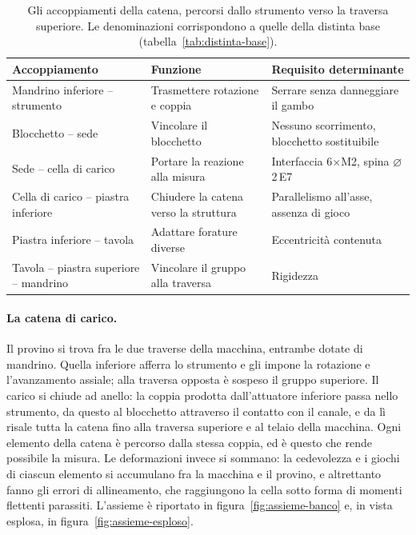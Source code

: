 \begin{table}[!tb]
    \centering
    \caption{Gli accoppiamenti della catena, percorsi dallo strumento verso la
    traversa superiore. Le denominazioni corrispondono a quelle della distinta
    base (tabella~\ref{tab:distinta-base}).}
    \label{tab:accoppiamenti}
    \footnotesize
    \setlength{\tabcolsep}{4pt}
    \begin{tabularx}{\linewidth}{@{}
        >{\hsize=1.2\hsize\raggedright\arraybackslash}X
        >{\hsize=0.95\hsize\raggedright\arraybackslash}X
        >{\hsize=0.85\hsize\raggedright\arraybackslash}X@{}}
        \toprule
        Accoppiamento & Funzione & Requisito determinante \\
        \midrule
        Mandrino inferiore -- strumento
            & Trasmettere rotazione e coppia
            & Serrare senza danneggiare il gambo \\
        Blocchetto -- sede
            & Vincolare il blocchetto
            & Nessuno scorrimento, blocchetto sostituibile \\
        Sede -- cella di carico
            & Portare la reazione alla misura
            & Interfaccia 6$\times$M2, spina $\varnothing$2\,E7 \\
        Cella di carico -- piastra inferiore
            & Chiudere la catena verso la struttura
            & Parallelismo all'asse, assenza di gioco \\
        Piastra inferiore -- tavola
            & Adattare forature diverse
            & Eccentricità contenuta \\
        Tavola -- piastra superiore -- mandrino
            & Vincolare il gruppo alla traversa
            & Rigidezza \\
        \bottomrule
    \end{tabularx}
\end{table}

\paragraph{La catena di carico.}
Il provino si trova fra le due traverse della macchina, entrambe dotate di
mandrino. Quella inferiore afferra lo strumento e gli impone la rotazione e
l'avanzamento assiale; alla traversa opposta è sospeso il gruppo superiore. Il
carico si chiude ad anello: la coppia prodotta dall'attuatore inferiore passa
nello strumento, da questo al blocchetto attraverso il contatto con il canale, e
da lì risale tutta la catena fino alla traversa superiore e al telaio della
macchina. Ogni elemento della catena è percorso dalla stessa coppia, ed è questo
che rende possibile la misura. Le deformazioni invece si sommano: la cedevolezza
e i giochi di ciascun elemento si accumulano fra la macchina e il provino, e
altrettanto fanno gli errori di allineamento, che raggiungono la cella sotto
forma di momenti flettenti parassiti. L'assieme è riportato in
figura~\ref{fig:assieme-banco} e, in vista esplosa, in
figura~\ref{fig:assieme-esploso}.

